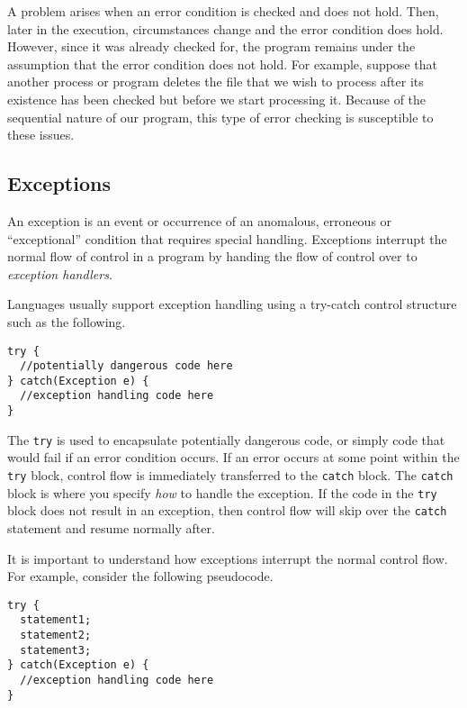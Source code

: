 A problem arises when an error condition is checked and
does not hold.  Then, later in the execution, circumstances change
and the error condition does hold.  However, since it was already
checked for, the program remains under the assumption that the
error condition does not hold.  For example, suppose that another
process or program deletes the file that we wish to process after 
its existence has been checked but before we start processing it.
Because of the sequential nature of our program, this type of 
error checking is susceptible to these issues.

\subsection{Exceptions}

An \gls{exception} is an event or occurrence of an anomalous, 
erroneous or ``exceptional'' condition that requires special 
handling.  Exceptions interrupt the normal flow of control in a
program by handing the flow of control over to \emph{exception
handlers}.

Languages usually support exception handling using a try-catch
control structure such as the following.

\begin{verbatim}
try {
  //potentially dangerous code here  
} catch(Exception e) {
  //exception handling code here
}
\end{verbatim}

The \texttt{try} is used to encapsulate potentially dangerous
code, or simply code that would fail if an error condition occurs.  If an
error occurs at some point within the \texttt{try} block, control
flow is immediately transferred to the \texttt{catch} block.
The \texttt{catch} block is where you specify \emph{how}
to handle the exception.  If the code in the \texttt{try} block 
does not result in an exception, then control flow will skip over the 
\texttt{catch} statement and resume normally after.  

It is important to understand how exceptions interrupt the normal
control flow.  For example, consider the following pseudocode.

\begin{verbatim}
try {
  statement1;
  statement2;
  statement3;
} catch(Exception e) {
  //exception handling code here
}
\end{verbatim}

